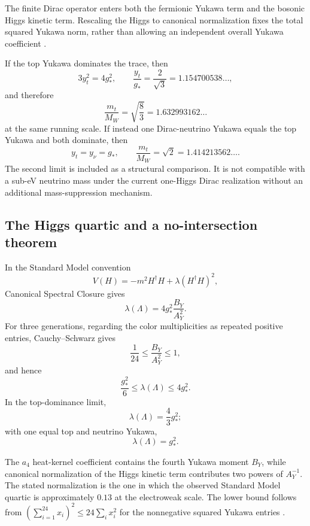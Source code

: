 \begin{proofsketch}
The finite Dirac operator enters both the fermionic Yukawa term and the bosonic Higgs kinetic
term.  Rescaling the Higgs to canonical normalization fixes the total squared Yukawa norm,
rather than allowing an independent overall Yukawa coefficient
\cite{chamseddine-connes-marcolli}.
\end{proofsketch}

\begin{corollary}
If the top Yukawa dominates the trace, then
\[
 3y_t^2=4g_*^2,
 \qquad
 \boxed{\frac{y_t}{g_*}=\frac2{\sqrt3}=1.154700538\ldots},
\]
and therefore
\[
 \boxed{\frac{m_t}{M_W}=\sqrt{\frac83}=1.632993162\ldots}
\]
at the same running scale.  If instead one Dirac-neutrino Yukawa equals the top Yukawa and
both dominate, then
\[
 y_t=y_\nu=g_*,
 \qquad
 \boxed{\frac{m_t}{M_W}=\sqrt2=1.414213562\ldots}.
\]
The second limit is included as a structural comparison.  It is not compatible with a
sub-eV neutrino mass under the current one-Higgs Dirac realization without an additional
mass-suppression mechanism.
\end{corollary}

\subsection{The Higgs quartic and a no-intersection theorem}

\begin{theorem}
\label{thm:csc-quartic}
In the Standard Model convention
\[
 V(H)=-m^2H^\dagger H+\lambda(H^\dagger H)^2,
\]
Canonical Spectral Closure gives
\[
 \boxed{
 \lambda(\Lambda)=4g_*^2\frac{B_Y}{A_Y^2}.
 }
\]
For three generations, regarding the color multiplicities as repeated positive entries,
Cauchy--Schwarz gives
\[
 \frac1{24}\le\frac{B_Y}{A_Y^2}\le1,
\]
and hence
\[
 \boxed{
 \frac{g_*^2}{6}\le\lambda(\Lambda)\le4g_*^2.
 }
\]
In the top-dominance limit,
\[
 \boxed{\lambda(\Lambda)=\frac43g_*^2};
\]
with one equal top and neutrino Yukawa,
\[
 \boxed{\lambda(\Lambda)=g_*^2}.
\]
\end{theorem}

\begin{proofsketch}
The $a_4$ heat-kernel coefficient contains the fourth Yukawa moment $B_Y$, while canonical
normalization of the Higgs kinetic term contributes two powers of $A_Y^{-1}$.  The stated
normalization is the one in which the observed Standard Model quartic is approximately
$0.13$ at the electroweak scale.  The lower bound follows from
$(\sum_{i=1}^{24}x_i)^2\le24\sum_i x_i^2$ for the nonnegative squared Yukawa entries
\cite{chamseddine-connes-marcolli}.
\end{proofsketch}


